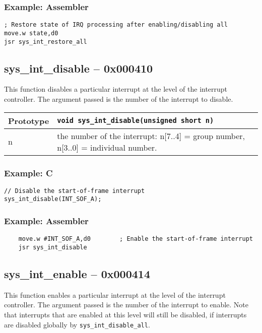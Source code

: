 \subsubsection*{Example: Assembler}
\begin{verbatim}
; Restore state of IRQ processing after enabling/disabling all
move.w state,d0
jsr sys_int_restore_all
\end{verbatim}

\subsection*{sys\_int\_disable -- 0x000410}
This function disables a particular interrupt at the level of the interrupt controller. The argument passed is the number of the interrupt to disable.

\bigskip

\begin{tabular}{|l||l|} \hline
Prototype & \lstinline!void sys_int_disable(unsigned short n)! \\ \hline
n & the number of the interrupt: n[7..4] = group number, n[3..0] = individual number. \\ \hline
\end{tabular}

\subsubsection*{Example: C}
\begin{lstlisting}
// Disable the start-of-frame interrupt
sys_int_disable(INT_SOF_A);
\end{lstlisting}

\subsubsection*{Example: Assembler}
\begin{verbatim}
    move.w #INT_SOF_A,d0        ; Enable the start-of-frame interrupt
    jsr sys_int_disable
\end{verbatim}

\subsection*{sys\_int\_enable -- 0x000414}
This function enables a particular interrupt at the level of the interrupt controller.
The argument passed is the number of the interrupt to enable. Note that interrupts that are enabled at this level will still be disabled,
if interrupts are disabled globally by \verb+sys_int_disable_all+.

